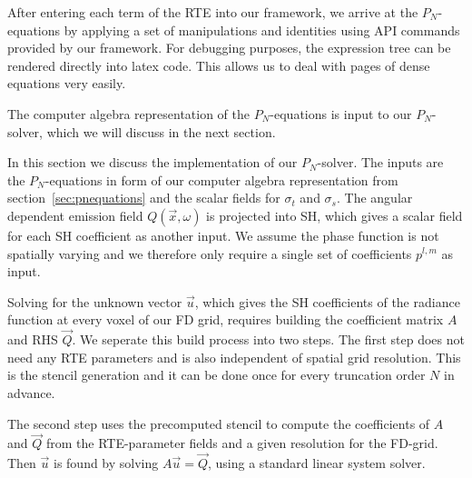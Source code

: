 After entering each term of the RTE into our framework, we arrive at the $P_N$-equations by applying a set of manipulations and identities using API commands provided by our framework. For debugging purposes, the expression tree can be rendered directly into latex code. This allows us to deal with pages of dense equations very easily.

The computer algebra representation of the $P_N$-equations is input to our $P_N$-solver, which we will discuss in the next section.


\begin{figure*}[t]
\centering
{}
\label{fig:pnsolver}
\end{figure*}

In this section we discuss the implementation of our $P_N$-solver. The inputs are the $P_N$-equations in form of our computer algebra representation from section~\ref{sec:pnequations} and the scalar fields for $\sigma_t$ and $\sigma_s$. The angular dependent emission field $Q\left(\vec{x}, \omega\right)$ is projected into SH, which gives a scalar field for each SH coefficient as another input. We assume the phase function is not spatially varying and we therefore only require a single set of coefficients $p^{l,m}$ as input.

Solving for the unknown vector $\vec{u}$, which gives the SH coefficients of the radiance function at every voxel of our FD grid, requires building the coefficient matrix $A$ and RHS $\vec{Q}$. We seperate this build process into two steps. The first step does not need any RTE parameters and is also independent of spatial grid resolution. This is the stencil generation and it can be done once for every truncation order $N$ in advance.

The second step uses the precomputed stencil to compute the coefficients of $A$ and $\vec{Q}$ from the RTE-parameter fields and a given resolution for the FD-grid. Then $\vec{u}$ is found by solving $A\vec{u}=\vec{Q}$, using a standard linear system solver.


